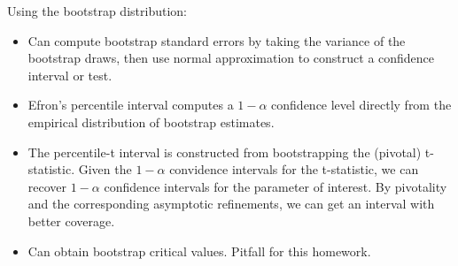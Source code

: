 \documentclass[12pt]{article}
\theoremstyle{plain}
\theoremstyle{definition}
\theoremstyle{remark}
\begin{document}
Using the bootstrap distribution:
\begin{itemize}
  \item Can compute bootstrap standard errors by taking the variance of
    the bootstrap draws, then use normal approximation to construct a
    confidence interval or test.
  \item Efron's percentile interval computes a $1-\alpha$ confidence
    level directly from the empirical distribution of bootstrap
    estimates.
  \item The percentile-t interval is constructed from bootstrapping the
    (pivotal) t-statistic. Given the $1-\alpha$ convidence intervals for
    the t-statistic, we can recover $1-\alpha$ confidence intervals for
    the parameter of interest. By pivotality and the corresponding
    asymptotic refinements, we can get an interval with better coverage.
  \item Can obtain bootstrap critical values.
    Pitfall for this homework.
\end{itemize}








\end{document}
